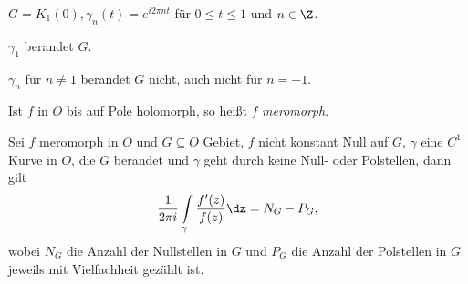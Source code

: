 \begin{bsp}
\label{bsp:2.95}
$G=K_1(0), \gamma_n(t) = e^{i2\pi nt}$ für $0\le t\le 1$ und $n\in \Z$.

$\gamma_1$ berandet $G$.

$\gamma_n$ für $n\neq 1$ berandet $G$ nicht, auch nicht für $n=-1$.\bsphere
\end{bsp}

\begin{defn}
\label{defn:2.96}
Ist $f$ in $O$ bis auf Pole holomorph, so heißt $f$
\emph{meromorph}.\fishhere
\end{defn}

\begin{prop}
\label{prop:2.97}
Sei $f$ meromorph in $O$ und $G\subseteq O$ Gebiet, $f$ nicht
konstant Null auf $G$, $\gamma$ eine $C^1$ Kurve in $O$, die $G$
berandet und $\gamma$ geht durch keine Null- oder Polstellen, dann gilt
\begin{align*}
\frac{1}{2\pi i}\int\limits_{\gamma} \frac{f'(z)}{f(z)}\dz = N_G-P_G,
\end{align*}
wobei $N_G$ die Anzahl der Nullstellen in $G$ und
$P_G$ die Anzahl der Polstellen in $G$ jeweils mit Vielfachheit gezählt
ist.\fishhere
\end{prop}
